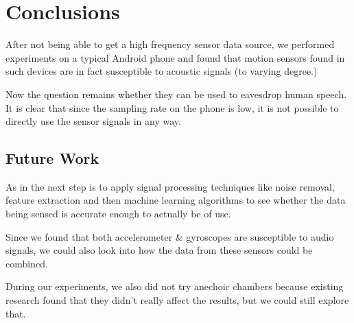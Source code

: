 \chapter{Conclusions}

After not being able to get a high frequency sensor data source, we performed experiments on a typical Android phone and found that motion sensors found in such devices are in fact susceptible to acoustic signals (to varying degree.)

Now the question remains whether they can be used to eavesdrop human speech. It is clear that since the sampling rate on the phone is low, it is not possible to directly use the sensor signals in any way.

\section{Future Work}

As in \cite{gyrophone} the next step is to apply signal processing techniques like noise removal, feature extraction and then machine learning algorithms to see whether the data being sensed is accurate enough to actually be of use.

Since we found that both accelerometer \& gyroscopes are susceptible to audio signals, we could also look into how the data from these sensors could be combined.

During our experiments, we also did not try anechoic chambers because existing research \cite{gyrophone} found that they didn’t really affect the results, but we could still explore that.



